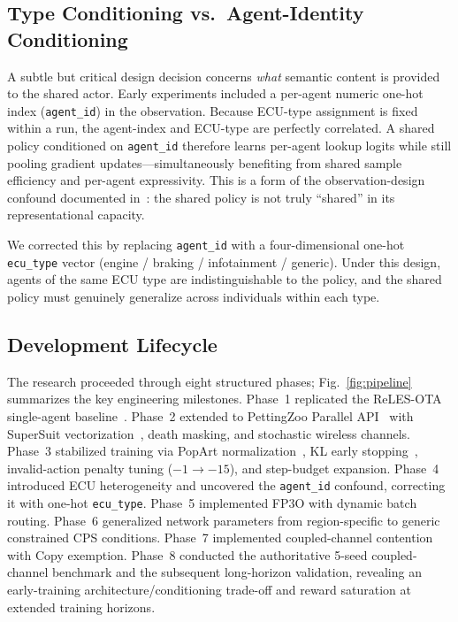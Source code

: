 \documentclass[conference]{IEEEtran}
\begin{document}
\subsection{Type Conditioning vs.\ Agent-Identity Conditioning}
\label{sec:type-cond}

A subtle but critical design decision concerns \emph{what} semantic content is
provided to the shared actor. Early experiments included a per-agent numeric one-hot
index (\texttt{agent\_id}) in the observation. Because ECU-type assignment is fixed
within a run, the agent-index and ECU-type are perfectly correlated. A shared policy
conditioned on \texttt{agent\_id} therefore learns per-agent lookup logits while still
pooling gradient updates---simultaneously benefiting from shared sample efficiency
and per-agent expressivity. This is a form of the observation-design confound
documented in~\cite{b14}: the shared policy is not truly ``shared'' in its
representational capacity.

We corrected this by replacing \texttt{agent\_id} with a four-dimensional one-hot
\texttt{ecu\_type} vector (engine / braking / infotainment / generic). Under this
design, agents of the same ECU type are indistinguishable to the policy, and the
shared policy must genuinely generalize across individuals within each type.

\subsection{Development Lifecycle}
\label{sec:lifecycle}

The research proceeded through eight structured phases; Fig.~\ref{fig:pipeline}
summarizes the key engineering milestones. Phase~1 replicated the ReLES-OTA
single-agent baseline~\cite{b1}. Phase~2 extended to PettingZoo Parallel
API~\cite{b9} with SuperSuit vectorization~\cite{b9}, death masking, and stochastic
wireless channels. Phase~3 stabilized training via PopArt normalization~\cite{vanhasselt2016popart},
KL early stopping~\cite{schulman2017ppo}, invalid-action penalty tuning ($-1\to-15$),
and step-budget expansion. Phase~4 introduced ECU heterogeneity and uncovered the
\texttt{agent\_id} confound, correcting it with one-hot \texttt{ecu\_type}.
Phase~5 implemented FP3O with dynamic batch routing. Phase~6 generalized network
parameters from region-specific to generic constrained CPS conditions. Phase~7 implemented
coupled-channel contention with Copy exemption. Phase~8 conducted the authoritative
5-seed coupled-channel benchmark and the subsequent long-horizon validation, revealing
an early-training architecture/conditioning trade-off and reward saturation at extended
training horizons.
\end{document}
